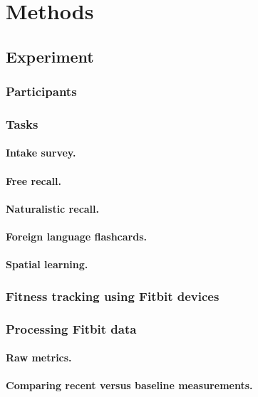 \documentclass[10pt]{article}
\begin{document}
\section*{Methods}
\subsection*{Experiment}
\subsubsection*{Participants}
\subsubsection*{Tasks}
\paragraph*{Intake survey.}
\paragraph*{Free recall.}
\paragraph*{Naturalistic recall.}
\paragraph*{Foreign language flashcards.}
\paragraph*{Spatial learning.}

\subsubsection*{Fitness tracking using Fitbit devices}

\subsubsection*{Processing Fitbit data}
\paragraph*{Raw metrics.}
\paragraph*{Comparing recent versus baseline measurements.}
\end{document}
